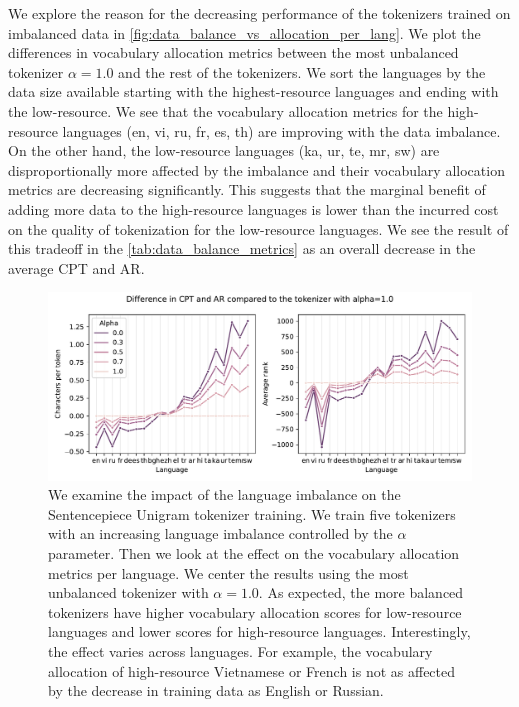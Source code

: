 We explore the reason for the decreasing performance of the tokenizers trained on imbalanced data in \autoref{fig:data_balance_vs_allocation_per_lang}. We plot the differences in vocabulary allocation metrics between the most unbalanced tokenizer $\alpha=1.0$ and the rest of the tokenizers. We sort the languages by the data size available starting with the highest-resource languages and ending with the low-resource. We see that the vocabulary allocation metrics for the high-resource languages (en, vi, ru, fr, es, th) are improving with the data imbalance. On the other hand, the low-resource languages (ka, ur, te, mr, sw) are disproportionally more affected by the imbalance and their vocabulary allocation metrics are decreasing significantly. This suggests that the marginal benefit of adding more data to the high-resource languages is lower than the incurred cost on the quality of tokenization for the low-resource languages. We see the result of this tradeoff in the \autoref{tab:data_balance_metrics} as an overall decrease in the average CPT and AR.

\begin{figure}[H]
    \centering
    \includegraphics[width=\textwidth]{figures/ar_cpt_vs_alpha.pdf}
    \caption{We examine the impact of the language imbalance on the Sentencepiece Unigram tokenizer training. We train five tokenizers with an increasing language imbalance controlled by the $\alpha$ parameter. Then we look at the effect on the vocabulary allocation metrics per language. We center the results using the most unbalanced tokenizer with $\alpha=1.0$. As expected, the more balanced tokenizers have higher vocabulary allocation scores for low-resource languages and lower scores for high-resource languages. Interestingly, the effect varies across languages. For example, the vocabulary allocation of high-resource Vietnamese or French is not as affected by the decrease in training data as English or Russian.}
    \label{fig:data_balance_vs_allocation_per_lang}
\end{figure}
